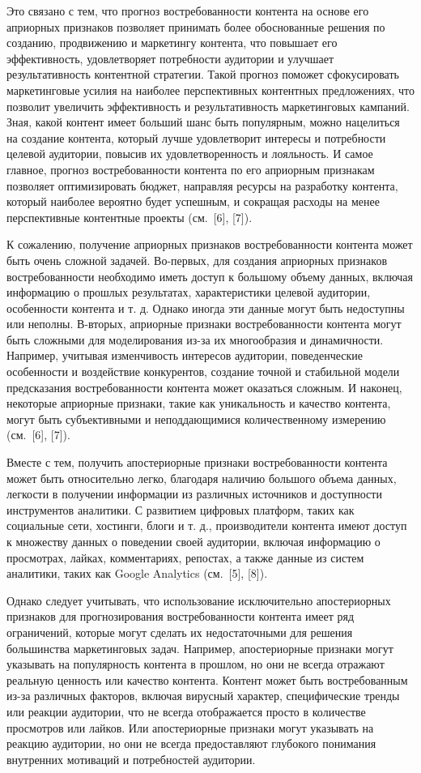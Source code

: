 \documentclass[a4paper,12pt]{article}
\begin{document}
Это связано с тем, что прогноз востребованности контента на основе его априорных признаков позволяет принимать более обоснованные решения по созданию, продвижению и маркетингу контента, что повышает его эффективность, удовлетворяет потребности аудитории и улучшает результативность контентной стратегии. Такой прогноз поможет сфокусировать маркетинговые усилия на наиболее перспективных контентных предложениях, что позволит увеличить эффективность и результативность маркетинговых кампаний. Зная, какой контент имеет больший шанс быть популярным, можно нацелиться на создание контента, который лучше удовлетворит интересы и потребности целевой аудитории, повысив их удовлетворенность и лояльность. И самое главное, прогноз востребованности контента по его априорным признакам позволяет оптимизировать бюджет, направляя ресурсы на разработку контента, который наиболее вероятно будет успешным, и сокращая расходы на менее перспективные контентные проекты (см. [6], [7]).

К сожалению, получение  априорных признаков востребованности контента может быть очень сложной задачей. Во-первых, для создания априорных признаков востребованности необходимо иметь доступ к большому объему данных, включая информацию о прошлых результатах, характеристики целевой аудитории, особенности контента и т. д. Однако иногда эти данные могут быть недоступны или неполны. В-вторых, априорные признаки востребованности контента могут быть сложными для моделирования из-за их многообразия и динамичности. Например, учитывая изменчивость интересов аудитории, поведенческие особенности и воздействие конкурентов, создание точной и стабильной модели предсказания востребованности контента может оказаться сложным. И наконец, некоторые априорные признаки, такие как уникальность и качество контента, могут быть субъективными и неподдающимися количественному измерению (см. [6], [7]).

Вместе с тем, получить апостериорные признаки востребованности контента может быть относительно легко, благодаря наличию большого объема данных, легкости в получении информации из различных источников и доступности инструментов аналитики. С развитием цифровых платформ, таких как социальные сети, хостинги, блоги и т. д., производители контента имеют доступ к множеству данных о поведении своей аудитории, включая информацию о просмотрах, лайках, комментариях, репостах, а также данные из систем аналитики, таких как Google Analytics (см. [5], [8]). 

Однако следует учитывать, что использование исключительно апостериорных признаков для прогнозирования востребованности контента имеет ряд ограничений, которые могут сделать их недостаточными для решения большинства маркетинговых задач. Например, апостериорные признаки могут указывать на популярность контента в прошлом, но они не всегда отражают реальную ценность или качество контента. Контент может быть востребованным из-за различных факторов, включая вирусный характер, специфические тренды или реакции аудитории, что не всегда отображается просто в количестве просмотров или лайков. Или апостериорные признаки могут указывать на реакцию аудитории, но они не всегда предоставляют глубокого понимания внутренних мотиваций и потребностей аудитории. 
\end{document}
